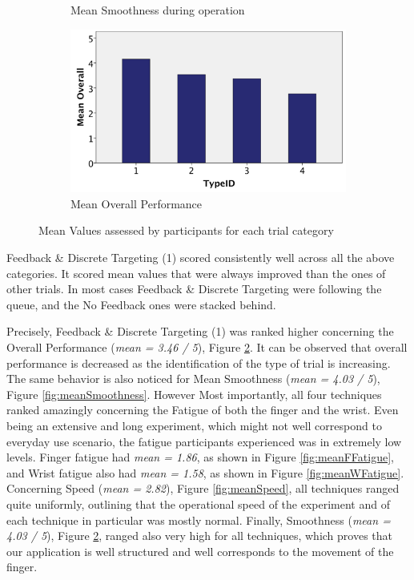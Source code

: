 \begin{figure}[H]
\begin{subfigure}[b]{0.4\textwidth}
        \caption{Mean Smoothness during operation}
        \label{fig:meanGComfort}
    \end{subfigure}
    \hfill
    \begin{subfigure}[b]{0.4\textwidth}
        \centering
        \includegraphics[width=\textwidth]{figures/meanOverall}
        \caption{Mean Overall Performance}
        \label{fig:meanOverall}
    \end{subfigure}
    \caption{Mean Values assessed by participants for each trial category}
    \label{fig:meanQuestGraphs}
\end{figure}

Feedback \& Discrete Targeting (1) scored consistently well across all the above categories. It scored mean values that were always improved than the ones of other trials. In most cases Feedback \& Discrete Targeting were following the queue, and the No Feedback ones were stacked behind.

Precisely, Feedback \& Discrete Targeting (1) was ranked higher concerning the Overall Performance (\emph{mean = 3.46 / 5}), Figure \ref{fig:meanOverall}. It can be observed that overall performance is decreased as the identification of the type of trial is increasing. The same behavior is also noticed for Mean Smoothness (\emph{mean = 4.03 / 5}), Figure \ref{fig:meanSmoothness}. However Most importantly, all four techniques ranked amazingly concerning the Fatigue of both the finger and the wrist. Even being an extensive and long experiment, which might not well correspond to everyday use scenario,  the fatigue  participants experienced was in extremely low levels. Finger fatigue had \emph{mean = 1.86}, as shown in Figure \ref{fig:meanFFatigue}, and Wrist fatigue also had \emph{mean = 1.58}, as shown in Figure \ref{fig:meanWFatigue}. Concerning Speed (\emph{mean = 2.82}), Figure \ref{fig:meanSpeed}, all techniques ranged quite uniformly, outlining that the operational speed of the experiment and of each technique in particular was mostly normal. Finally, Smoothness (\emph{mean = 4.03 / 5}), Figure \ref{fig:meanOverall}, ranged also very high for all techniques, which proves that our application is well structured and well corresponds to the movement of the finger.




